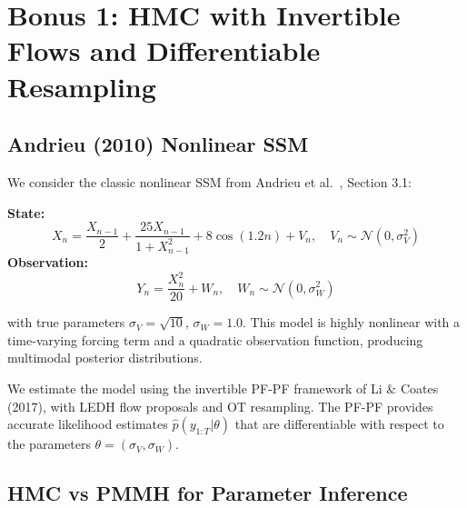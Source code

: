 \documentclass[12pt,a4paper]{article}
\theoremstyle{definition}
\theoremstyle{remark}
\newcommand{\N}{\mathcal{N}}
\begin{document}
\section{Bonus 1: HMC with Invertible Flows and Differentiable Resampling}
\label{sec:bonus1}

\subsection{Andrieu (2010) Nonlinear SSM}

We consider the classic nonlinear SSM from Andrieu et al.\ \citep{andrieu2010}, Section 3.1:

\begin{tcolorbox}[colback=gray!5!white,colframe=gray!50!black,title=Nonlinear SSM (Andrieu 2010)]
	\textbf{State:}
	\begin{equation}
		X_n = \frac{X_{n-1}}{2} + \frac{25 X_{n-1}}{1 + X_{n-1}^2} + 8\cos(1.2n) + V_n, \quad V_n \sim \N(0, \sigma_V^2)
	\end{equation}
	\textbf{Observation:}
	\begin{equation}
		Y_n = \frac{X_n^2}{20} + W_n, \quad W_n \sim \N(0, \sigma_W^2)
	\end{equation}
\end{tcolorbox}

\noindent with true parameters $\sigma_V = \sqrt{10}$, $\sigma_W = 1.0$. This model is highly nonlinear with a time-varying forcing term and a quadratic observation function, producing multimodal posterior distributions.

We estimate the model using the invertible PF-PF framework of Li \& Coates (2017), with LEDH flow proposals and OT resampling. The PF-PF provides accurate likelihood estimates $\hat{p}(y_{1:T} | \theta)$ that are differentiable with respect to the parameters $\theta = (\sigma_V, \sigma_W)$.

\subsection{HMC vs PMMH for Parameter Inference}
\end{document}
